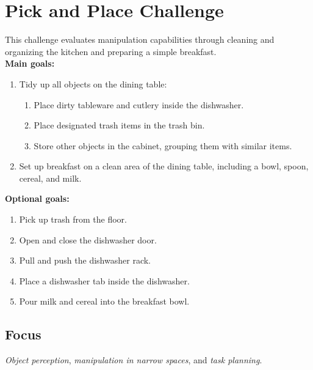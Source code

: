 \section{Pick and Place Challenge}
\label{test:pick-and-place-challenge}
This challenge evaluates manipulation capabilities through cleaning and organizing the kitchen and preparing a simple breakfast.\\

\noindent \textbf{Main goals:}
\begin{enumerate}[nosep]
	\item Tidy up all objects on the dining table:
	\begin{enumerate}[nosep]
		\item Place dirty tableware and cutlery inside the dishwasher.
		\item Place designated trash items in the trash bin.
		\item Store other objects in the cabinet, grouping them with similar items.
	\end{enumerate}
	\item Set up breakfast on a clean area of the dining table, including a bowl, spoon, cereal, and milk.
\end{enumerate}
\smallskip
\noindent \textbf{Optional goals:}
\begin{enumerate}[nosep]
	\item Pick up trash from the floor.
	\item Open and close the dishwasher door.
	\item Pull and push the dishwasher rack.
	\item Place a dishwasher tab inside the dishwasher.
	\item Pour milk and cereal into the breakfast bowl.
\end{enumerate}

\subsection*{Focus}
\emph{Object perception}, \emph{manipulation in narrow spaces}, and \emph{task planning}.

